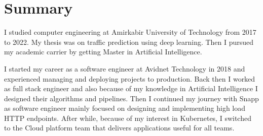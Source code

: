\section{Summary}\closesection{}

I studied computer engineering at Amirkabir University of Technology from 2017 to 2022.
My thesis was on traffic prediction using deep learning.
Then I pursued my academic carrier by getting Master in Artificial Intelligence.

I started my career as a software engineer at Avidnet Technology in 2018 and experienced managing
and deploying projects to production. Back then I worked as full stack engineer and also because
of my knowledge in Artificial Intelligence I designed their algorithms and pipelines.
Then I continued my journey with Snapp as software engineer mainly focused on designing and implementing
high load HTTP endpoints. After while, because of my interest in Kubernetes, I switched to the Cloud platform
team that delivers applications useful for all teams.